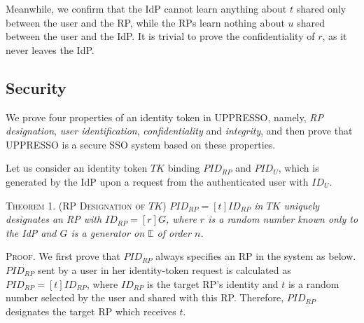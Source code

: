 Meanwhile, we confirm that the IdP cannot learn anything about $t$ shared only between the user and the RP,
 while the RPs learn nothing about $u$ shared between the user and the IdP.
It is trivial to prove the confidentiality of $r$, as it never leaves the IdP.

\subsection{Security}
\label{analysis-security}


We prove four properties of an identity token in UPPRESSO,
namely, \emph{RP designation}, \emph{user identification}, \emph{confidentiality} and \emph{integrity},
and then prove that UPPRESSO is a secure SSO system based on these properties.

Let us consider an identity token $TK$ binding $PID_{RP}$ and $PID_U$, which is generated by the IdP upon a request from the authenticated user with $ID_U$.


\vspace{1mm}
\noindent\textsc{Theorem 1. (RP Designation of $TK$)} {\em $PID_{RP}= [t]ID_{RP}$ in $TK$ uniquely designates an RP with $ID_{RP} = [r]G$,
 where $r$ is a random number known only to the IdP and $G$ is a generator on $\mathbb{E}$ of order $n$.}

\vspace{0.75mm}
\noindent\textsc{Proof.} We first prove that $PID_{RP}$ always specifies an RP in the system as below.
$PID_{RP}$ sent by a user in her identity-token request is calculated as $PID_{RP} = [t]ID_{RP}$,
 where $ID_{RP}$ is the target RP's identity and $t$ is a random number selected by the user and shared with this RP.
 Therefore, $PID_{RP}$ designates the target RP which receives $t$.

